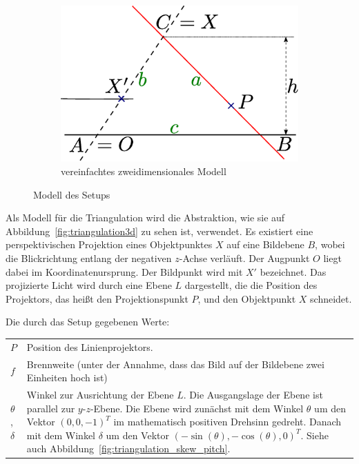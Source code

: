 \documentclass[ngerman,a4paper,parskip=half]{scrartcl}
\begin{document}
\begin{figure}
	\begin{subfigure}{0.45\textwidth}
		\includegraphics[width=\textwidth]{includes/triangulation2d}
		\caption{vereinfachtes zweidimensionales Modell}
		\label{fig:triangulation2d}
	\end{subfigure}
	\caption{Modell des Setups}
\end{figure}

Als Modell für die Triangulation wird die Abstraktion, wie sie auf Abbildung~\ref{fig:triangulation3d} zu sehen ist, verwendet. Es existiert eine perspektivischen Projektion eines Objektpunktes $X$ auf eine Bildebene $B$, wobei die Blickrichtung entlang der negativen $z$-Achse verläuft. Der Augpunkt $O$ liegt dabei im Koordinatenursprung. Der Bildpunkt wird mit $X'$ bezeichnet. Das projizierte Licht wird durch eine Ebene $L$ dargestellt, die die Position des Projektors, das heißt den Projektionspunkt $P$, und den Objektpunkt $X$ schneidet.

Die durch das Setup gegebenen Werte:

\begin{tabular}{lp{12cm}}
	$P$                &
		Position des Linienprojektors.\\[0.5em]
	$f$                &
		Brennweite
		(unter der Annahme, dass das Bild auf der Bildebene zwei Einheiten hoch ist)\\[0.5em]
	$\theta$,$\delta$  &
		Winkel zur Ausrichtung der Ebene $L$. Die Ausgangslage der Ebene ist parallel zur $y$-$z$-Ebene. Die Ebene wird zunächst mit dem Winkel $\theta$ um den Vektor $(0,0,-1)^T$  im mathematisch positiven Drehsinn gedreht. Danach mit dem Winkel $\delta$ um den Vektor $(-\sin(\theta), -\cos(\theta), 0)^T$. Siehe auch Abbildung~\ref{fig:triangulation_skew_pitch}.
\end{tabular}
\end{document}
